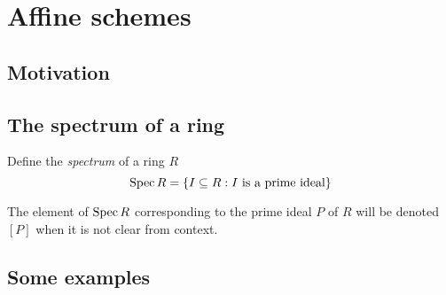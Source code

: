 \chapter{Affine schemes}

\section{Motivation}
\label{sec:motivation-for-affine-schemes}

\section{The spectrum of a ring}
\label{sec:the-spectrum-of-a-ring}

\begin{definition}
 Define the \emph{spectrum} of a ring $R$ 
\[ \operatorname{Spec} R = \{ I \subseteq R : I \text{ is a prime ideal} \} \]
\end{definition}

The element of $\operatorname{Spec} R$ corresponding to the prime ideal $P$ of $R$ will be
denoted $[P]$ when it is not clear from context.

\section{Some examples}
\label{sec:examples-of-affine-schemes}
